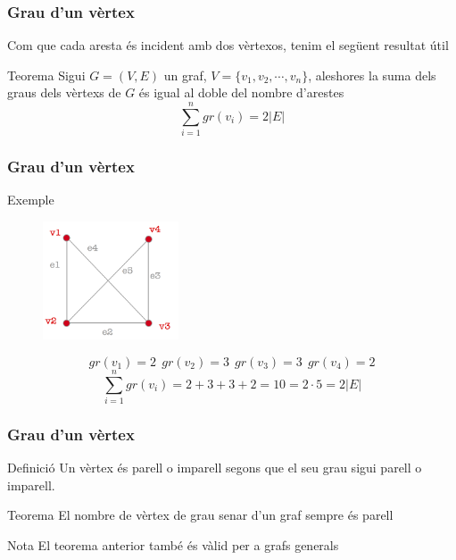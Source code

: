 \documentclass{beamer}
\begin{document}
\begin{frame}
\frametitle{Grau d'un vèrtex}

Com que cada aresta és incident amb dos vèrtexos, tenim el següent resultat útil
\begin{block}{Teorema}
Sigui $G=(V,E)$ un graf, $V=\{v_1,v_2,\cdots, v_n\}$, aleshores la suma dels graus dels vèrtexs de $G$ és igual al doble del nombre d'arestes
\[\displaystyle\sum_{i=1}^n gr(v_i) = 2|E|\]
\end{block}
\end{frame}



\begin{frame}
\frametitle{Grau d'un vèrtex}

\begin{block}{Exemple}
\begin{figure}[h]
 \label{fig:volum}
\centering
\includegraphics[height=3.5cm]{g6}
\end{figure}
\[gr(v_1) = 2\ \ gr(v_2) = 3\ \ gr(v_3) = 3\ \ gr(v_4) = 2\]
\[\displaystyle\sum_{i=1}^n gr(v_i) = 2 + 3 + 3 +2 = 10 = 2\cdot 5 =  2|E|\]
\end{block}
\end{frame}




\begin{frame}
\frametitle{Grau d'un vèrtex}

\begin{block}{Definició}
Un vèrtex és parell o imparell segons que el seu grau sigui parell o imparell.
\end{block}

\begin{block}{Teorema}
El nombre de vèrtex de grau senar d'un graf sempre és parell
\end{block}

\begin{block}{Nota}
El teorema anterior també és vàlid per a grafs generals
\end{block}
\end{frame}
\end{document}
